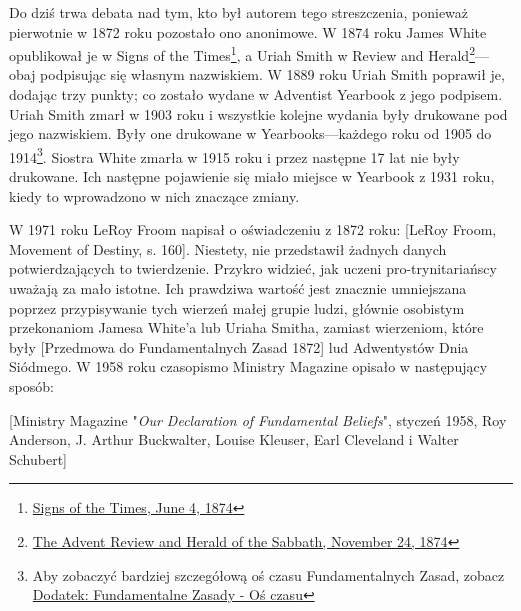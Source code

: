 Do dziś trwa debata nad tym, kto był autorem tego streszczenia, ponieważ pierwotnie w 1872 roku pozostało ono anonimowe. W 1874 roku James White opublikował je w Signs of the Times\footnote{\href{https://adventistdigitallibrary.org/adl-364148/signs-times-june-4-1874}{Signs of the Times, June 4, 1874}}, a Uriah Smith w Review and Herald\footnote{\href{http://documents.adventistarchives.org/Periodicals/RH/RH18741124-V44-22.pdf}{The Advent Review and Herald of the Sabbath, November 24, 1874}}—obaj podpisując się własnym nazwiskiem. W 1889 roku Uriah Smith poprawił je, dodając trzy punkty; co zostało wydane w Adventist Yearbook  z jego podpisem. Uriah Smith zmarł w 1903 roku i wszystkie kolejne wydania  były drukowane pod jego nazwiskiem. Były one drukowane w Yearbooks—każdego roku od 1905 do 1914\footnote{Aby zobaczyć bardziej szczegółową oś czasu Fundamentalnych Zasad, zobacz \hyperref[appendix:timeline]{Dodatek: Fundamentalne Zasady - Oś czasu}}. Siostra White zmarła w 1915 roku i przez następne 17 lat  nie były drukowane. Ich następne pojawienie się miało miejsce w Yearbook z 1931 roku, kiedy to wprowadzono w nich znaczące zmiany.

W 1971 roku LeRoy Froom napisał o oświadczeniu z 1872 roku: [LeRoy Froom, Movement of Destiny, s. 160]. Niestety, nie przedstawił żadnych danych potwierdzających to twierdzenie. Przykro widzieć, jak uczeni pro-trynitariańscy uważają  za mało istotne. Ich prawdziwa wartość jest znacznie umniejszana poprzez przypisywanie tych wierzeń małej grupie ludzi, głównie osobistym przekonaniom Jamesa White'a lub Uriaha Smitha, zamiast wierzeniom, które były [Przedmowa do Fundamentalnych Zasad 1872] lud Adwentystów Dnia Siódmego. W 1958 roku czasopismo Ministry Magazine opisało  w następujący sposób:

[Ministry Magazine "\textit{Our Declaration of Fundamental Beliefs}", styczeń 1958, Roy Anderson, J. Arthur Buckwalter, Louise Kleuser, Earl Cleveland i Walter Schubert]

